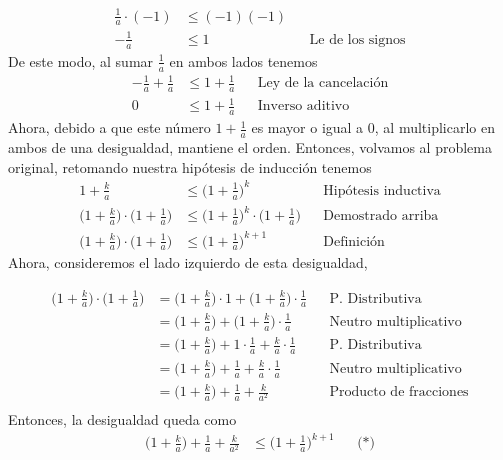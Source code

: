 \documentclass[11pt]{article}
\begin{document}
\begin{enumerate}
\begin{enumerate}[label=\roman*)]
\begin{align*}
  \frac{1}{a} \cdot (-1) &\leq (-1)(-1)\\
  -\frac{1}{a} &\leq 1 && \text{Le de los signos}
 \end{align*} De este modo, al sumar $\frac{1}{a}$ en ambos lados tenemos \begin{align*}
  -\frac{1}{a}+\frac{1}{a} &\leq 1+\frac{1}{a} && \text{Ley de la cancelación}\\
  0 &\leq 1+\frac{1}{a} && \text{Inverso aditivo}
 \end{align*} Ahora, debido a que este número $1+\frac{1}{a}$ es mayor o igual a $0$, al multiplicarlo en ambos de una desigualdad, mantiene el orden. Entonces, volvamos al problema original, retomando nuestra hipótesis de inducción tenemos\begin{align*}
  1+\frac{k}{a} &\leq \biggl(1+\frac{1}{a}\biggr)^k && \text{Hipótesis inductiva}\\
  \biggl(1+\frac{k}{a}\biggr) \cdot \biggl(1+\frac{1}{a}\biggr) &\leq  \biggl(1+\frac{1}{a}\biggr)^k \cdot \biggl(1+\frac{1}{a}\biggr) && \text{Demostrado arriba}\\
  \biggl(1+\frac{k}{a}\biggr) \cdot \biggl(1+\frac{1}{a}\biggr) &\leq  \biggl(1+\frac{1}{a}\biggr)^{k+1} && \text{Definición}
 \end{align*} Ahora, consideremos el lado izquierdo de esta desigualdad,
 
 \pagebreak

 \begin{align*}
  \biggl(1+\frac{k}{a}\biggr) \cdot \biggl(1+\frac{1}{a}\biggr) &= \biggl(1+\frac{k}{a}\biggr) \cdot 1 + \biggl(1+\frac{k}{a}\biggr) \cdot \frac{1}{a} && \text{P. Distributiva}\\
  &= \biggl(1+\frac{k}{a}\biggr)+ \biggl(1+\frac{k}{a}\biggr) \cdot \frac{1}{a} && \text{Neutro multiplicativo}\\
  &= \biggl(1+\frac{k}{a}\biggr)+ 1 \cdot \frac{1}{a}+\frac{k}{a} \cdot \frac{1}{a} && \text{P. Distributiva}\\
  &= \biggl(1+\frac{k}{a}\biggr)+ \frac{1}{a}+\frac{k}{a} \cdot \frac{1}{a} && \text{Neutro multiplicativo}\\
  &= \biggl(1+\frac{k}{a}\biggr)+ \frac{1}{a}+\frac{k}{a^2} && \text{Producto de fracciones}\\
 \end{align*} Entonces, la desigualdad queda como \begin{align*}
  \biggl(1+\frac{k}{a}\biggr)+ \frac{1}{a}+\frac{k}{a^2} &\leq \biggl(1+\frac{1}{a}\biggr)^{k+1} && \text{(*)}
 \end{align*} 
 

\end{enumerate}
\end{enumerate}
\end{document}
